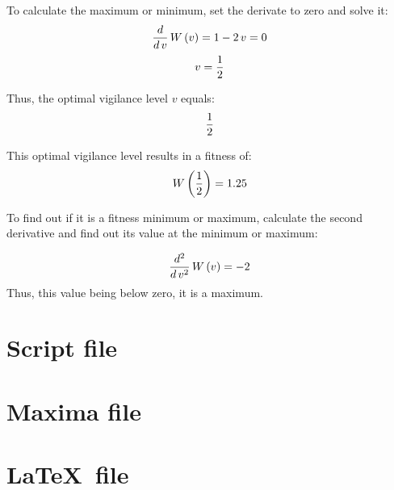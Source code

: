 \documentclass{article}
\begin{document}
To calculate the maximum or minimum, set the derivate to zero and solve it:
$${{d}\over{d\,v}}\,W\left(v\right)=1-2\,v=0$$
$$v={{1}\over{2}}$$

Thus, the optimal vigilance level $v$ equals:$${{1}\over{2}}$$

This optimal vigilance level results in a fitness of:$$W\left({{1}\over{2}}\right)=1.25$$

To find out if it is a fitness minimum or maximum,
calculate the second derivative
and find out its value at the minimum or maximum:

$${{d^2}\over{d\,v^2}}\,W\left(v\right)=-2$$
Thus, this value being below zero, it is a maximum.

\appendix

\section{Script file}



\section{Maxima file}



\section{\LaTeX~file}


\end{document}
